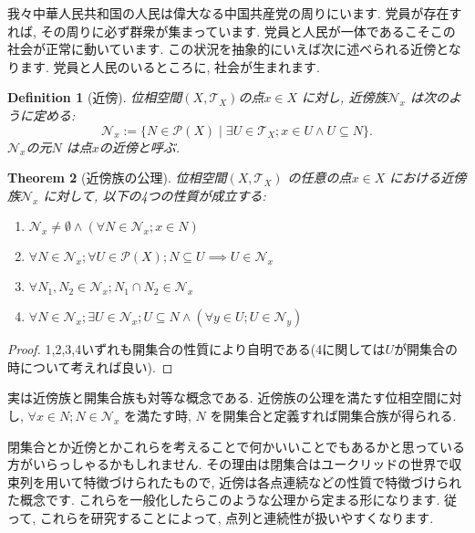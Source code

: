 \documentclass[dvipdfmx]{jbook}
\newtheorem{theorem}{Theorem}[section]
\newtheorem{definition}[theorem]{Definition}
\theoremstyle{remark}
\theoremstyle{plain}
\begin{document}
我々中華人民共和国の人民は偉大なる中国共産党の周りにいます. 党員が存在すれば, その周りに必ず群衆が集まっています. 党員と人民が一体であるこそこの社会が正常に動いています. この状況を抽象的にいえば次に述べられる近傍となります. 党員と人民のいるところに, 社会が生まれます.

\begin{definition}[近傍]
	位相空間$\left( X, \mathcal{T}_X \right)$の点$x \in X$ に対し, 近傍族$\mathcal{N}_x$ は次のように定める:
	\[
	\mathcal{N}_x := \{N \in \mathcal{P}\left( X \right)  \mid \exists U \in \mathcal{T}_X ; x \in U \land U \subseteq N \} 
	.\] 
	$\mathcal{N}_x $の元$N$ は点$x$の近傍と呼ぶ.
\end{definition}

\begin{theorem}[近傍族の公理]
	位相空間$\left( X ,\mathcal{T}_X \right) $ の任意の点$x\in X$ における近傍族$\mathcal{N}_x$ に対して, 以下の4つの性質が成立する:
	\begin{enumerate}
		\item $\mathcal{N}_x \neq \emptyset \land \left( \forall N \in \mathcal{N}_x ; x \in N \right)$
		\item $\forall N \in \mathcal{N}_x; \forall U \in \mathcal{P}\left( X \right) ; N\subseteq U \implies U \in \mathcal{N}_x$
		\item $\forall N_1, N_2 \in \mathcal{N}_x ; N_1 \cap N_2 \in \mathcal{N}_x$
		\item $\forall N \in \mathcal{N}_x; \exists U \in \mathcal{N}_x ;U\subseteq N\land \left( \forall y \in U; U \in \mathcal{N}_y  \right)  $
	\end{enumerate}
\end{theorem}

\begin{proof}
	1,2,3,4いずれも開集合の性質により自明である(4に関しては$U$が開集合の時について考えれば良い).
\end{proof}

実は近傍族と開集合族も対等な概念である. 近傍族の公理を満たす位相空間に対し, $\forall x \in N; N \in \mathcal{N}_x$ を満たす時, $N$ を開集合と定義すれば開集合族が得られる. 

閉集合とか近傍とかこれらを考えることで何かいいことでもあるかと思っている方がいらっしゃるかもしれません.
その理由は閉集合はユークリッドの世界で収束列を用いて特徴づけられたもので, 近傍は各点連続などの性質で特徴づけられた概念です.
これらを一般化したらこのような公理から定まる形になります. 従って, これらを研究することによって, 点列と連続性が扱いやすくなります.
\end{document}
